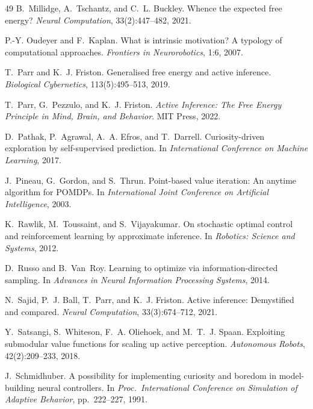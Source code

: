 \documentclass[runningheads]{llncs}
\begin{document}
\begin{thebibliography}{49}
B.~Millidge, A.~Tschantz, and C.~L. Buckley.
\newblock Whence the expected free energy?
\newblock \emph{Neural Computation}, 33(2):447--482, 2021.

P.-Y. Oudeyer and F.~Kaplan.
\newblock What is intrinsic motivation? {A} typology of computational approaches.
\newblock \emph{Frontiers in Neurorobotics}, 1:6, 2007.

T.~Parr and K.~J. Friston.
\newblock Generalised free energy and active inference.
\newblock \emph{Biological Cybernetics}, 113(5):495--513, 2019.

T.~Parr, G.~Pezzulo, and K.~J. Friston.
\newblock \emph{Active Inference: The Free Energy Principle in Mind, Brain, and Behavior}.
\newblock MIT Press, 2022.

D.~Pathak, P.~Agrawal, A.~A. Efros, and T.~Darrell.
\newblock Curiosity-driven exploration by self-supervised prediction.
\newblock In \emph{International Conference on Machine Learning}, 2017.

J.~Pineau, G.~Gordon, and S.~Thrun.
\newblock Point-based value iteration: An anytime algorithm for {POMDP}s.
\newblock In \emph{International Joint Conference on Artificial Intelligence}, 2003.

K.~Rawlik, M.~Toussaint, and S.~Vijayakumar.
\newblock On stochastic optimal control and reinforcement learning by approximate inference.
\newblock In \emph{Robotics: Science and Systems}, 2012.

D.~Russo and B.~Van~Roy.
\newblock Learning to optimize via information-directed sampling.
\newblock In \emph{Advances in Neural Information Processing Systems}, 2014.

N.~Sajid, P.~J. Ball, T.~Parr, and K.~J. Friston.
\newblock Active inference: Demystified and compared.
\newblock \emph{Neural Computation}, 33(3):674--712, 2021.

Y.~Satsangi, S.~Whiteson, F.~A. Oliehoek, and M.~T.~J. Spaan.
\newblock Exploiting submodular value functions for scaling up active perception.
\newblock \emph{Autonomous Robots}, 42(2):209--233, 2018.

J.~Schmidhuber.
\newblock A possibility for implementing curiosity and boredom in model-building neural controllers.
\newblock In \emph{Proc.\ International Conference on Simulation of Adaptive Behavior}, pp.\ 222--227, 1991.


\end{thebibliography}
\end{document}
